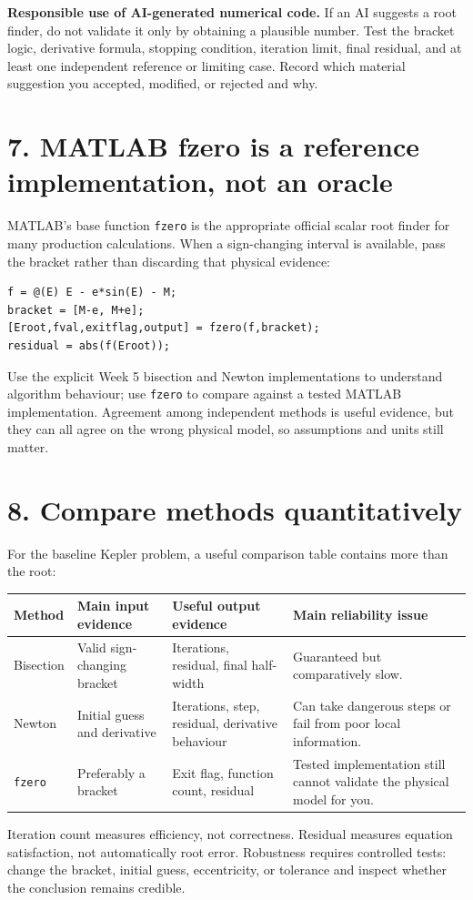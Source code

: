 \documentclass[11pt,a4paper]{article}
\begin{document}
\begin{aibox}
\textbf{Responsible use of AI-generated numerical code.} If an AI suggests a root finder, do not validate it only by obtaining a plausible number. Test the bracket logic, derivative formula, stopping condition, iteration limit, final residual, and at least one independent reference or limiting case. Record which material suggestion you accepted, modified, or rejected and why.
\end{aibox}

\section*{7. MATLAB fzero is a reference implementation, not an oracle}
MATLAB's base function \texttt{fzero} is the appropriate official scalar root finder for many production calculations. When a sign-changing interval is available, pass the bracket rather than discarding that physical evidence:
\begin{lstlisting}[style=matlabstyle,caption={Reference solve with an independently checked residual.}]
f = @(E) E - e*sin(E) - M;
bracket = [M-e, M+e];
[Eroot,fval,exitflag,output] = fzero(f,bracket);
residual = abs(f(Eroot));
\end{lstlisting}
Use the explicit Week 5 bisection and Newton implementations to understand algorithm behaviour; use \texttt{fzero} to compare against a tested MATLAB implementation. Agreement among independent methods is useful evidence, but they can all agree on the wrong physical model, so assumptions and units still matter.

\section*{8. Compare methods quantitatively}
For the baseline Kepler problem, a useful comparison table contains more than the root:
\begin{center}
\begin{tabular}{p{25mm}p{30mm}p{32mm}p{62mm}}
\toprule
Method & Main input evidence & Useful output evidence & Main reliability issue \\
\midrule
Bisection & Valid sign-changing bracket & Iterations, residual, final half-width & Guaranteed but comparatively slow. \\
Newton & Initial guess and derivative & Iterations, step, residual, derivative behaviour & Can take dangerous steps or fail from poor local information. \\
\texttt{fzero} & Preferably a bracket & Exit flag, function count, residual & Tested implementation still cannot validate the physical model for you. \\
\bottomrule
\end{tabular}
\end{center}
Iteration count measures efficiency, not correctness. Residual measures equation satisfaction, not automatically root error. Robustness requires controlled tests: change the bracket, initial guess, eccentricity, or tolerance and inspect whether the conclusion remains credible.
\end{document}

